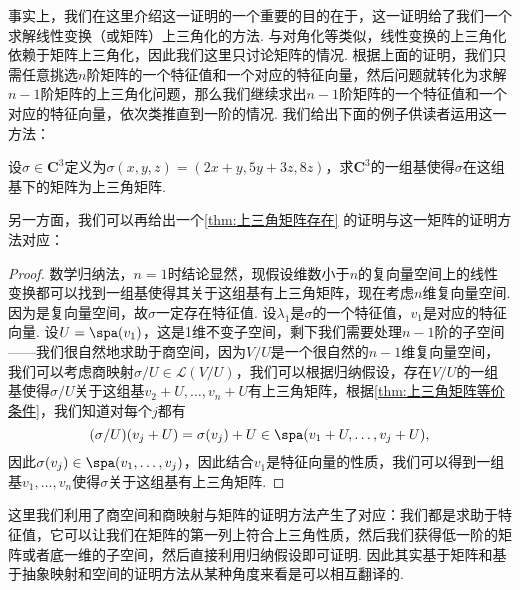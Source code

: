 事实上，我们在这里介绍这一证明的一个重要的目的在于，这一证明给了我们一个求解线性变换（或矩阵）上三角化的方法. 与对角化等类似，线性变换的上三角化依赖于矩阵上三角化，因此我们这里只讨论矩阵的情况. 根据上面的证明，我们只需任意挑选$n$阶矩阵的一个特征值和一个对应的特征向量，然后问题就转化为求解$n-1$阶矩阵的上三角化问题，那么我们继续求出$n-1$阶矩阵的一个特征值和一个对应的特征向量，依次类推直到一阶的情况. 我们给出下面的例子供读者运用这一方法：
\begin{example}{}{}
    设$\sigma\in\mathbf{C}^3$定义为$\sigma(x,y,z)=(2x+y,5y+3z,8z)$，求$\mathbf{C}^3$的一组基使得$\sigma$在这组基下的矩阵为上三角矩阵.
\end{example}

\begin{solution}

\end{solution}

另一方面，我们可以再给出一个\autoref{thm:上三角矩阵存在} 的证明与这一矩阵的证明方法对应：
\begin{proof}
    数学归纳法，$n=1$时结论显然，现假设维数小于$n$的复向量空间上的线性变换都可以找到一组基使得其关于这组基有上三角矩阵，现在考虑$n$维复向量空间. 因为是复向量空间，故$\sigma$一定存在特征值. 设$\lambda_1$是$\sigma$的一个特征值，$v_1$是对应的特征向量. 设$U=\spa(v_1)$，这是1维不变子空间，剩下我们需要处理$n-1$阶的子空间——我们很自然地求助于商空间，因为$V/U$是一个很自然的$n-1$维复向量空间，我们可以考虑商映射$\sigma/U\in\mathcal{L}(V/U)$，我们可以根据归纳假设，存在$V/U$的一组基使得$\sigma/U$关于这组基$v_2+U,\ldots,v_n+U$有上三角矩阵，根据\autoref{thm:上三角矩阵等价条件}，我们知道对每个$j$都有
    \[(\sigma/U)(v_j+U)=\sigma(v_j)+U\in\spa(v_1+U,\ldots,v_j+U),\]
    因此$\sigma(v_j)\in\spa(v_1,\ldots,v_j)$，因此结合$v_1$是特征向量的性质，我们可以得到一组基$v_1,\ldots,v_n$使得$\sigma$关于这组基有上三角矩阵.
\end{proof}

这里我们利用了商空间和商映射与矩阵的证明方法产生了对应：我们都是求助于特征值，它可以让我们在矩阵的第一列上符合上三角性质，然后我们获得低一阶的矩阵或者底一维的子空间，然后直接利用归纳假设即可证明. 因此其实基于矩阵和基于抽象映射和空间的证明方法从某种角度来看是可以相互翻译的.

